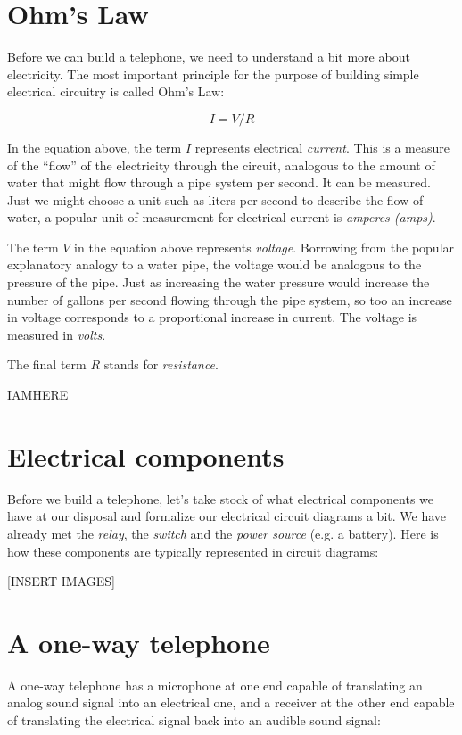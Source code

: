 \documentclass[UTF8]{book}
\begin{document}
\begin{CJK}{UTF8}{gbsn}
\section{Ohm's Law}

Before we can build a telephone, we need to understand a bit more about electricity. The most important principle for the purpose of building simple electrical circuitry is called Ohm's Law:

\[ I = V/R \]

In the equation above, the term $I$ represents electrical \emph{current}. This is a measure of the ``flow'' of the electricity through the circuit, analogous to the amount of water that might flow through a pipe system per second. It can be measured. Just we might choose a unit such as liters per second to describe the flow of water, a popular unit of measurement for electrical current is \emph{amperes (amps)}.

The term $V$ in the equation above represents \emph{voltage}. Borrowing from the popular explanatory analogy to a water pipe, the voltage would be analogous to the pressure of the pipe. Just as increasing the water pressure would increase the number of gallons per second flowing through the pipe system, so too an increase in voltage corresponds to a proportional increase in current. The voltage is measured in \emph{volts}.

The final term $R$ stands for \emph{resistance}.

IAMHERE

\section{Electrical components}

Before we build a telephone, let's take stock of what electrical components we have at our disposal and formalize our electrical circuit diagrams a bit. We have already met the \emph{relay}, the \emph{switch} and the \emph{power source} (e.g. a battery). Here is how these components are typically represented in circuit diagrams:

[INSERT IMAGES]

\section{A one-way telephone}

A one-way telephone has a microphone at one end capable of translating an analog sound signal into an electrical one, and a receiver at the other end capable of translating the electrical signal back into an audible sound signal:


\end{CJK}
\end{document}
